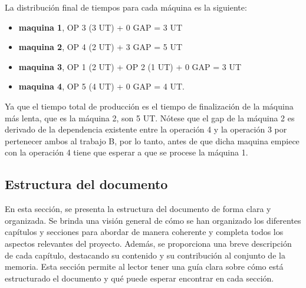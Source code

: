 La distribución final de tiempos para cada máquina es la siguiente: 
\begin{itemize}
    \item \textbf{maquina 1}, OP 3 (3 UT) + 0 GAP = 3 UT 
    \item \textbf{maquina 2}, OP 4 (2 UT) + 3 GAP = 5 UT 
    \item \textbf{maquina 3}, OP 1 (2 UT) + OP 2 (1 UT) + 0 GAP = 3 UT 
    \item \textbf{maquina 4}, OP 5 (4 UT) + 0 GAP = 4 UT. 
\end{itemize}

Ya que el tiempo total de producción es el tiempo de finalización de la máquina más lenta, 
que es la máquina 2, son 5 UT. Nótese que el gap de la máquina 2 es derivado de la dependencia
existente entre la operación 4 y la operación 3 por pertenecer ambos al trabajo B, 
por lo tanto, antes de que dicha maquina empiece con la operación 4 tiene que esperar 
a que se procese la máquina 1.

\subsection{Estructura del documento}
En esta sección, se presenta la estructura del documento de forma clara y organizada. Se 
brinda una visión general de cómo se han organizado los diferentes capítulos y secciones 
para abordar de manera coherente y completa todos los aspectos relevantes del proyecto. 
Además, se proporciona una breve descripción de cada capítulo, destacando su contenido 
y su contribución al conjunto de la memoria. Esta sección permite al lector tener una 
guía clara sobre cómo está estructurado el documento y qué puede esperar encontrar en cada 
sección.

